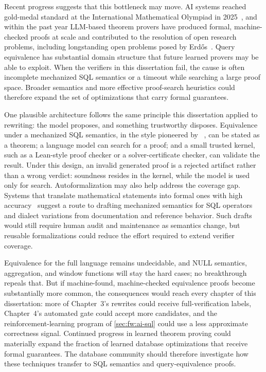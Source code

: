 Recent progress suggests that this bottleneck may move. AI
systems reached gold-medal standard at the International Mathematical
Olympiad in 2025~\cite{luong2025imogold}, and within the past year
LLM-based theorem provers have produced formal, machine-checked proofs
at scale and contributed to the resolution of open research problems,
including longstanding open problems posed by
Erd\H{o}s~\cite{tsoukalas2026proofsearch}. Query equivalence has
substantial domain structure that future learned provers may be able
to exploit. When the verifiers in this dissertation fail, the cause is
often incomplete mechanized SQL semantics or a timeout while searching
a large proof space. Broader semantics and more effective proof-search
heuristics could therefore expand the set of optimizations that carry
formal guarantees.

One plausible architecture follows the same principle this dissertation
applied to rewriting: the model proposes, and something trustworthy
disposes. Equivalence under a mechanized SQL semantics, in the style
pioneered by \cosette~\cite{chu2017cosette}, can be stated as a theorem;
a language model can search for a proof; and a small trusted kernel,
such as a Lean-style proof checker or a solver-certificate checker, can
validate the result. Under this design, an invalid generated proof is a
rejected artifact rather than a wrong verdict: soundness resides in the
kernel, while the model is used only for search. Autoformalization may
also help address the coverage gap. Systems that translate mathematical
statements into formal ones with high accuracy~\cite{gao2025herald}
suggest a route to drafting mechanized semantics for SQL operators and
dialect variations from documentation and reference behavior. Such
drafts would still require human audit and maintenance as semantics
change, but reusable formalizations could reduce the effort required to
extend verifier coverage.

Equivalence for the full language remains undecidable, and NULL
semantics, aggregation, and window functions will stay the hard cases;
no breakthrough repeals that. But if machine-found, machine-checked
equivalence proofs become substantially more common, the consequences
would reach every chapter of this dissertation: more of Chapter~3's
rewrites could receive full-verification labels, Chapter~4's automated
gate could accept more candidates, and the reinforcement-learning
program of \cref{sec:fw:ai-sql} could use a less approximate correctness
signal.
Continued progress in learned theorem proving could materially expand
the fraction of learned database optimizations that receive formal
guarantees. The database community should therefore investigate how
these techniques transfer to SQL semantics and query-equivalence
proofs.
